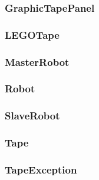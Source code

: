 \documentclass[%
  a4paper,%
  11pt,%
  blue,%
  hyperref	%
  ]{tubsartcl}
\begin{document}
\subsubsection{GraphicTapePanel}

\subsubsection{LEGOTape}

\subsubsection{MasterRobot}

\subsubsection{Robot}

\subsubsection{SlaveRobot}


\subsubsection{Tape}

\subsubsection{TapeException}


\makebackpage[trisec]%
\end{document}
